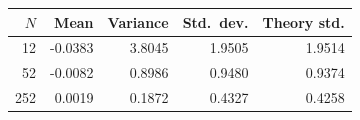 \begin{tabular}{rrrrr}
\toprule
$N$ & Mean & Variance & Std.\ dev. & Theory std. \\
\midrule
12 & -0.0383 & 3.8045 & 1.9505 & 1.9514 \\
52 & -0.0082 & 0.8986 & 0.9480 & 0.9374 \\
252 & 0.0019 & 0.1872 & 0.4327 & 0.4258 \\
\bottomrule
\end{tabular}
